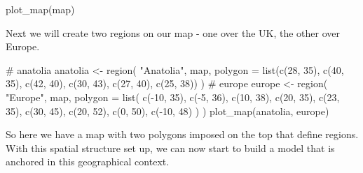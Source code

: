 \documentclass[
  letterpaper,
  DIV=11,
  numbers=noendperiod]{scrartcl}
\newenvironment{Shaded}{\begin{snugshade}}{\end{snugshade}}
\newcommand{\AttributeTok}[1]{\textcolor[rgb]{0.40,0.45,0.13}{#1}}
\newcommand{\CommentTok}[1]{\textcolor[rgb]{0.37,0.37,0.37}{#1}}
\newcommand{\DecValTok}[1]{\textcolor[rgb]{0.68,0.00,0.00}{#1}}
\newcommand{\FunctionTok}[1]{\textcolor[rgb]{0.28,0.35,0.67}{#1}}
\newcommand{\NormalTok}[1]{\textcolor[rgb]{0.00,0.23,0.31}{#1}}
\newcommand{\OtherTok}[1]{\textcolor[rgb]{0.00,0.23,0.31}{#1}}
\newcommand{\SpecialCharTok}[1]{\textcolor[rgb]{0.37,0.37,0.37}{#1}}
\newcommand{\StringTok}[1]{\textcolor[rgb]{0.13,0.47,0.30}{#1}}
\begin{document}
\begin{Shaded}
\begin{Highlighting}[]
\FunctionTok{plot\_map}\NormalTok{(map)}
\end{Highlighting}
\end{Shaded}

Next we will create two regions on our map - one over the UK, the other
over Europe.

\begin{Shaded}
\begin{Highlighting}[]
\CommentTok{\# anatolia}
\NormalTok{anatolia }\OtherTok{\textless{}{-}} \FunctionTok{region}\NormalTok{(}
  \StringTok{"Anatolia"}\NormalTok{, map,}
  \AttributeTok{polygon =} \FunctionTok{list}\NormalTok{(}\FunctionTok{c}\NormalTok{(}\DecValTok{28}\NormalTok{, }\DecValTok{35}\NormalTok{), }\FunctionTok{c}\NormalTok{(}\DecValTok{40}\NormalTok{, }\DecValTok{35}\NormalTok{), }\FunctionTok{c}\NormalTok{(}\DecValTok{42}\NormalTok{, }\DecValTok{40}\NormalTok{),}
                 \FunctionTok{c}\NormalTok{(}\DecValTok{30}\NormalTok{, }\DecValTok{43}\NormalTok{), }\FunctionTok{c}\NormalTok{(}\DecValTok{27}\NormalTok{, }\DecValTok{40}\NormalTok{), }\FunctionTok{c}\NormalTok{(}\DecValTok{25}\NormalTok{, }\DecValTok{38}\NormalTok{))}
\NormalTok{)}
\CommentTok{\# europe}
\NormalTok{europe }\OtherTok{\textless{}{-}} \FunctionTok{region}\NormalTok{(}
  \StringTok{"Europe"}\NormalTok{, map,}
  \AttributeTok{polygon =} \FunctionTok{list}\NormalTok{(}
    \FunctionTok{c}\NormalTok{(}\SpecialCharTok{{-}}\DecValTok{10}\NormalTok{, }\DecValTok{35}\NormalTok{), }\FunctionTok{c}\NormalTok{(}\SpecialCharTok{{-}}\DecValTok{5}\NormalTok{, }\DecValTok{36}\NormalTok{), }\FunctionTok{c}\NormalTok{(}\DecValTok{10}\NormalTok{, }\DecValTok{38}\NormalTok{), }\FunctionTok{c}\NormalTok{(}\DecValTok{20}\NormalTok{, }\DecValTok{35}\NormalTok{), }\FunctionTok{c}\NormalTok{(}\DecValTok{23}\NormalTok{, }\DecValTok{35}\NormalTok{),}
    \FunctionTok{c}\NormalTok{(}\DecValTok{30}\NormalTok{, }\DecValTok{45}\NormalTok{), }\FunctionTok{c}\NormalTok{(}\DecValTok{20}\NormalTok{, }\DecValTok{52}\NormalTok{), }\FunctionTok{c}\NormalTok{(}\DecValTok{0}\NormalTok{, }\DecValTok{50}\NormalTok{), }\FunctionTok{c}\NormalTok{(}\SpecialCharTok{{-}}\DecValTok{10}\NormalTok{, }\DecValTok{48}\NormalTok{)}
\NormalTok{  )}
\NormalTok{)}
\FunctionTok{plot\_map}\NormalTok{(anatolia, europe)}
\end{Highlighting}
\end{Shaded}

So here we have a map with two polygons imposed on the top that define
regions. With this spatial structure set up, we can now start to build a
model that is anchored in this geographical context.
\end{document}
